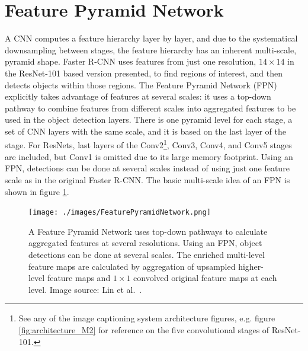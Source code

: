 \documentclass[english,twoside,openright]{HYgraduMLDS}
\begin{document}
\section{Feature Pyramid Network}
\label{section:FeaturePyramidNetwork}
A CNN computes a feature hierarchy layer by layer, and due to the systematical downsampling between stages, the feature hierarchy has an inherent multi-scale, pyramid shape. Faster R-CNN uses features from just one resolution, $14 \times 14$ in the ResNet-101 based version presented, to find regions of interest, and then detects objects within those regions.  The Feature Pyramid Network (FPN)~\cite{FeaturePyramidNetworks} explicitly takes advantage of features at several scales: it uses a top-down pathway to combine features from different scales into aggregated features to be used in the object detection layers. There is one pyramid level for each stage, a set of CNN layers with the same scale, and it is based on the last layer of the stage. For ResNets, last layers of the Conv2\footnote{See any of the image captioning system architecture figures, e.g. figure \ref{fig:architecture_M2} for reference on the five convolutional stages of ResNet-101.}, Conv3, Conv4, and Conv5 stages are included, but Conv1 is omitted due to its large memory footprint. Using an FPN, detections can be done at several scales instead of using just one feature scale as in the original Faster R-CNN. The basic multi-scale idea of an FPN is shown in figure \ref{fig:FeaturePyramidNetwork}. 
\begin{figure}[h] 
\centering
\texttt{[image: ./images/FeaturePyramidNetwork.png]}
\caption{A Feature Pyramid Network uses top-down pathways to calculate aggregated features at several resolutions. Using an FPN, object detections can be done at several scales. The enriched multi-level feature maps are calculated by aggregation of upsampled higher-level feature maps and $1 \times 1$ convolved original feature maps at each level. Image source: Lin et al.~\cite{FeaturePyramidNetworks}.}
\label{fig:FeaturePyramidNetwork} 
\end{figure}
\end{document}
